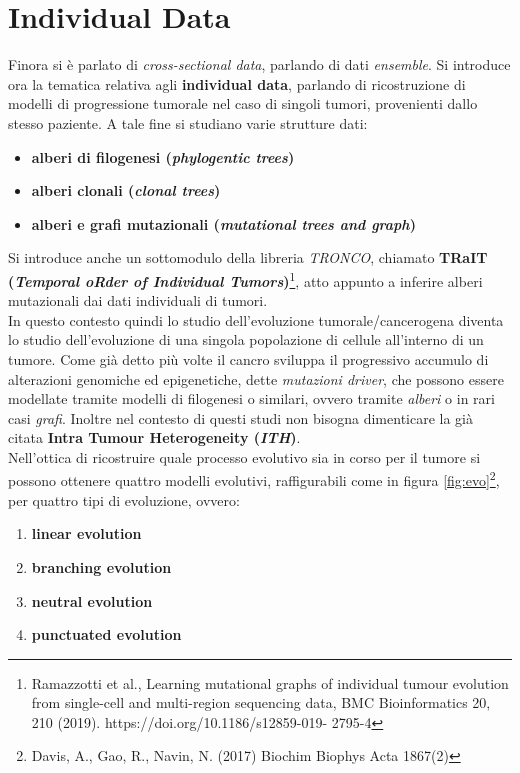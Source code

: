 \documentclass[a4paper,12pt, oneside]{book}
\begin{document}
\section{Individual Data}
Finora si è parlato di \textit{cross-sectional data}, parlando di dati
\textit{ensemble}. Si introduce ora la tematica relativa agli \textbf{individual
data}, parlando di ricostruzione di modelli di progressione tumorale nel caso di
singoli tumori, provenienti dallo stesso paziente. A tale fine si studiano varie
strutture dati:
\begin{itemize}
  \item \textbf{alberi di filogenesi (\textit{phylogentic trees})}
  \item \textbf{alberi clonali (\textit{clonal trees})}
  \item \textbf{alberi e grafi mutazionali (\textit{mutational trees and graph})}
\end{itemize}
Si introduce anche un sottomodulo della libreria \textit{TRONCO}, chiamato
\textbf{TRaIT (\textit{Temporal oRder of Individual
    Tumors})}\footnote{Ramazzotti et al., Learning mutational graphs of
  individual tumour 
  evolution from single-cell and multi-region sequencing data, BMC
  Bioinformatics 20, 210 (2019). https://doi.org/10.1186/s12859-019-
  2795-4}, atto appunto a
inferire alberi mutazionali dai dati individuali di tumori.\\
In questo contesto quindi lo studio dell'evoluzione tumorale/cancerogena diventa
lo studio dell'evoluzione di una singola popolazione di cellule all'interno di
un tumore. Come già detto più volte il cancro sviluppa il progressivo accumulo
di alterazioni genomiche ed epigenetiche, dette \textit{mutazioni driver}, che
possono essere modellate tramite modelli di filogenesi o similari, ovvero
tramite \textit{alberi} o in rari casi \textit{grafi}. Inoltre nel
contesto di questi studi non bisogna dimenticare la già citata \textbf{Intra
  Tumour Heterogeneity (\textit{ITH})}.\\
Nell'ottica di ricostruire quale processo evolutivo sia in corso per il tumore
si possono ottenere quattro modelli evolutivi, raffigurabili come in figura
\ref{fig:evo}\footnote{Davis, A., Gao, R., Navin, N. (2017) Biochim Biophys Acta
  1867(2)}, per quattro tipi di evoluzione, ovvero: 
\begin{enumerate}
  \item \textbf{linear evolution}
  \item \textbf{branching evolution}
  \item \textbf{neutral evolution}
  \item \textbf{punctuated evolution}
\end{enumerate}
\end{document}

